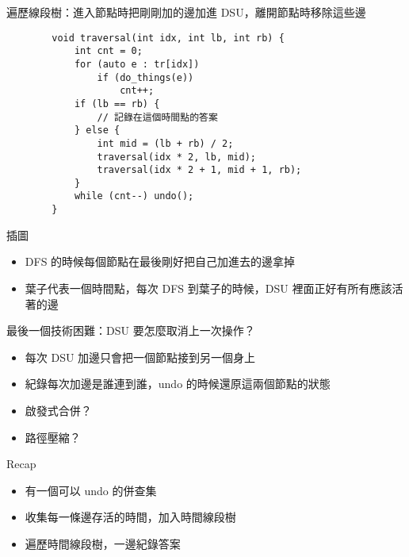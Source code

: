 \begin{frame}[fragile]{\ebtitle}
    遍歷線段樹：進入節點時把剛剛加的邊加進 DSU，離開節點時移除這些邊
    \begin{verbatim}
        void traversal(int idx, int lb, int rb) {
            int cnt = 0;
            for (auto e : tr[idx])
                if (do_things(e))
                    cnt++;
            if (lb == rb) {
                // 記錄在這個時間點的答案
            } else {
                int mid = (lb + rb) / 2;
                traversal(idx * 2, lb, mid);
                traversal(idx * 2 + 1, mid + 1, rb); 
            }
            while (cnt--) undo();
        }
    \end{verbatim}
\end{frame}

\begin{frame}{\ebtitle}
    \todo 插圖
\end{frame}

\begin{frame}{\ebtitle}
    \begin{itemize}
        \item DFS 的時候每個節點在最後剛好把自己加進去的邊拿掉
        \item 葉子代表一個時間點，每次 DFS 到葉子的時候，DSU 裡面正好有所有應該活著的邊
    \end{itemize}
\end{frame}

\begin{frame}{\ebtitle}
    最後一個技術困難：DSU 要怎麼取消上一次操作？

    \begin{itemize}
        \item 每次 DSU 加邊只會把一個節點接到另一個身上
        \item 紀錄每次加邊是誰連到誰，undo 的時候還原這兩個節點的狀態
        \item 啟發式合併？ 
        \item 路徑壓縮？ 
    \end{itemize}
\end{frame}

\begin{frame}{\ebtitle}
    Recap
    
    \begin{itemize}
        \item 有一個可以 undo 的併查集
        \item 收集每一條邊存活的時間，加入時間線段樹
        \item 遍歷時間線段樹，一邊紀錄答案
    \end{itemize}
\end{frame}

